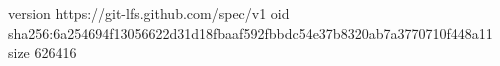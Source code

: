 version https://git-lfs.github.com/spec/v1
oid sha256:6a254694f13056622d31d18fbaaf592fbbdc54e37b8320ab7a3770710f448a11
size 626416
